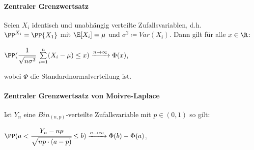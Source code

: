 \paragraph{Zentraler Grenzwertsatz}
Seien $X_i$ identisch und unabhängig verteilte Zufallsvariablen, d.h. $\PP^{X_i}=\PP{X_1}$ mit $\E[X_i]=\mu$ und $\sigma^2\coloneqq Var(X_i)$. Dann gilt für alle $x\in\R$:
\begin{tightcenter}
	$\PP(\cfrac{1}{\sqrt{n\sigma^2}}\;\sum\limits_{i=1}^{n}(X_i-\mu)\leq x)\xrightarrow{n\rightarrow\infty}\Phi(x)$,
\end{tightcenter}
wobei $\Phi$ die Standardnormalverteilung ist.

\paragraph{Zentraler Grenzwertsatz von Moivre-Laplace}
Ist $Y_n$ eine $Bin_{(n,p)}$-verteilte Zufallsvariable mit $p\in(0,1)$ so gilt:
\begin{tightcenter}
	$\PP(a<\cfrac{Y_n-np}{\sqrt{np\cdot(a-p)}}\leq b)\xrightarrow{n\rightarrow\infty}\Phi(b)-\Phi(a)$,
\end{tightcenter}